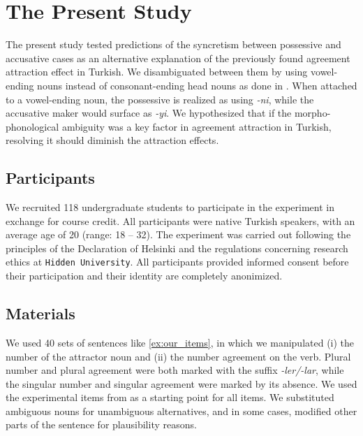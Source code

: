 \documentclass[brill,linguex]{glossa}\usepackage[]{graphicx}\usepackage[]{color}
\begin{document}
\section{The Present Study}

The present study tested predictions of the syncretism between possessive and accusative cases as an alternative explanation of the previously found agreement attraction effect in Turkish. We disambiguated between them by using vowel-ending nouns instead of consonant-ending head nouns as done in \citet{LagoEtAl:2019}. When attached to a vowel-ending noun, the possessive is realized as using \textit{-ni}, while the accusative maker would surface as \textit{-yi}. We hypothesized that if the morpho-phonological ambiguity was a key factor in agreement attraction in Turkish, resolving it should diminish the attraction effects.

\subsection{Participants} 

We recruited 118 undergraduate students to participate in the experiment in exchange for course credit. All participants were native Turkish speakers, with an average age of 20 (range: 18 -- 32). The experiment was carried out following the principles of the Declaration of Helsinki and the regulations concerning research ethics at \texttt{Hidden University}. All participants provided informed consent before their participation and their identity are completely anonimized.



\subsection{Materials}

We used 40 sets of sentences like \ref{ex:our_items}, in which we manipulated (i) the number of the attractor noun and (ii) the number agreement on the verb. Plural number and plural agreement were both marked with the suffix \textit{-ler/-lar}, while the singular number and singular agreement were marked by its absence. We used the experimental items from \citet{LagoEtAl:2019} as a starting point for all items. We substituted ambiguous nouns for unambiguous alternatives, and in some cases, modified other parts of the sentence for plausibility reasons.
\end{document}
